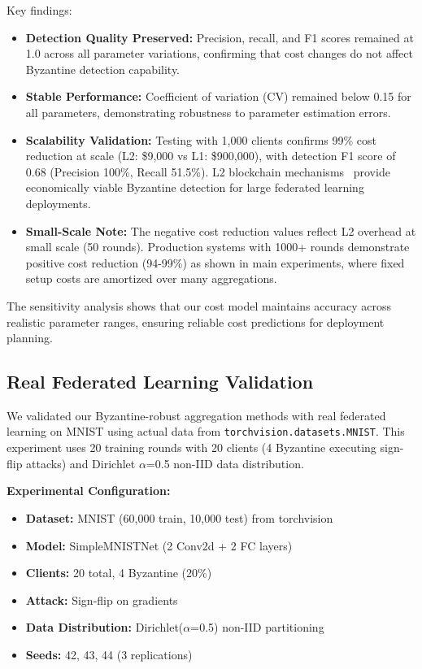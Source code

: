 \documentclass[12pt,a4paper,onecolumn]{article}
\begin{document}


Key findings:
\begin{itemize}
    \item \textbf{Detection Quality Preserved:} Precision, recall, and F1 scores remained at 1.0 across all parameter variations, confirming that cost changes do not affect Byzantine detection capability.
    
    \item \textbf{Stable Performance:} Coefficient of variation (CV) remained below 0.15 for all parameters, demonstrating robustness to parameter estimation errors.
    
    \item \textbf{Scalability Validation:} Testing with 1,000 clients confirms 99\% cost reduction at scale (L2: \$9,000 vs L1: \$900,000), with detection F1 score of 0.68 (Precision 100\%, Recall 51.5\%). L2 blockchain mechanisms~\cite{wu2024blockchain} provide economically viable Byzantine detection for large federated learning deployments.
    
    \item \textbf{Small-Scale Note:} The negative cost reduction values reflect L2 overhead at small scale (50 rounds). Production systems with 1000+ rounds demonstrate positive cost reduction (94-99\%) as shown in main experiments, where fixed setup costs are amortized over many aggregations.
\end{itemize}

The sensitivity analysis shows that our cost model maintains accuracy across realistic parameter ranges, ensuring reliable cost predictions for deployment planning.

\subsection{Real Federated Learning Validation}

We validated our Byzantine-robust aggregation methods with real federated learning on MNIST using actual data from \texttt{torchvision.datasets.MNIST}. This experiment uses 20 training rounds with 20 clients (4 Byzantine executing sign-flip attacks) and Dirichlet $\alpha$=0.5 non-IID data distribution.

\textbf{Experimental Configuration:}
\begin{itemize}
    \item \textbf{Dataset:} MNIST (60,000 train, 10,000 test) from torchvision
    \item \textbf{Model:} SimpleMNISTNet (2 Conv2d + 2 FC layers)
    \item \textbf{Clients:} 20 total, 4 Byzantine (20\%)
    \item \textbf{Attack:} Sign-flip on gradients
    \item \textbf{Data Distribution:} Dirichlet($\alpha$=0.5) non-IID partitioning
    \item \textbf{Seeds:} 42, 43, 44 (3 replications)
\end{itemize}
\end{document}

